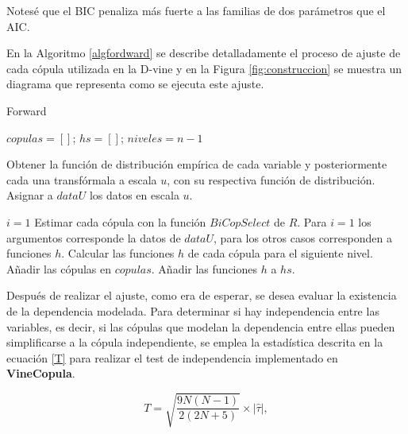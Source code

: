 Notesé que el BIC penaliza más fuerte a las familias de dos parámetros que el AIC.

En la Algoritmo \ref{algfordward} se describe detalladamente el proceso de ajuste de cada cópula utilizada en la D-vine y en la Figura \ref{fig:construccion} se muestra un diagrama que representa como se ejecuta este ajuste.

\begin{algorithm}[H]
      \caption{Forward}
      \label{algfordward}
      \begin{algorithmic}[1]  

        \State $copulas =  \left [  \right ]$; $hs =  \left [  \right ]$; $niveles = n-1$
        
        \State Obtener la función de distribución empírica de cada variable y posteriormente cada una transfórmala a escala $u$, con su respectiva función de distribución. 
        \State Asignar a $dataU$ los datos en escala $u$.
        
        \State $i = 1$
          \State Estimar cada cópula con la función $BiCopSelect$ de $R$. Para $i = 1$ los argumentos corresponde la datos de $dataU$, para los otros casos corresponden a funciones $h$.
          \State Calcular las funciones $h$ de cada cópula para el siguiente nivel.
          \State Añadir las cópulas en $copulas$.
          \State Añadir las funciones $h$ a $hs$.
        \EndWhile
       
      \end{algorithmic}
    \end{algorithm}



Después de realizar el ajuste, como era de esperar, se desea evaluar la existencia de la dependencia modelada. Para determinar si hay independencia entre las variables, es decir, si las cópulas que modelan la dependencia entre ellas pueden simplificarse a la cópula independiente, se emplea la estadística descrita en la ecuación \eqref{T} para realizar el test de independencia implementado en \textbf{VineCopula}.
    
\begin{equation}\label{T}
    T = \sqrt{\frac{9N(N - 1)}{2(2N + 5)}} \times |\hat{\tau}|,
\end{equation}

